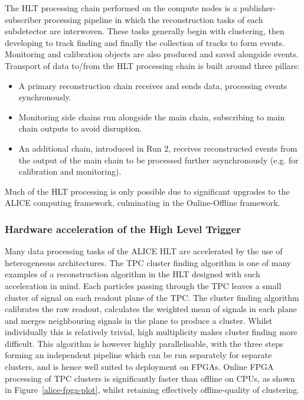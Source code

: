 The HLT processing chain performed on the compute nodes is a publisher-subscriber processing pipeline in which the reconstruction tasks of each subdetector are interwoven. These tasks generally begin with clustering, then developing to track finding and finally the collection of tracks to form events. Monitoring and calibration objects are also produced and saved alongside events. Transport of data to/from the HLT processing chain is built around three pillars:
\begin{itemize}
    \item A primary reconstruction chain receives and sends data, processing events synchronously.
    \item Monitoring side chains run alongside the main chain, subscribing to main chain outputs to avoid disruption.
    \item An additional chain, introduced in Run 2, receives reconstructed events from the output of the main chain to be processed further asynchronously (e.g. for calibration and monitoring).
\end{itemize}
Much of the HLT processing is only possible due to significant upgrades to the ALICE computing framework, culminating in the Online-Offline \cite{alice-o2-tdr} framework.

\subsubsection{Hardware acceleration of the High Level Trigger}
\label{alice-accel}

Many data processing tasks of the ALICE HLT are accelerated by the use of heterogeneous architectures. The TPC cluster finding algorithm is one of many examples of a reconstruction algorithm in the HLT designed with such acceleration in mind. Each particles passing through the TPC leaves a small cluster of signal  on each readout plane of the TPC. The cluster finding algorithm calibrates the raw readout, calculates the weighted mean of signals in each plane and merges neighbouring signals in the plane to produce a cluster. Whilst individually this is relatively trivial, high multiplicity makes cluster finding more difficult. This algorithm is however highly parallelisable, with the three steps forming an independent pipeline which can be run separately for separate clusters, and is hence well suited to deployment on FPGAs. Online FPGA processing of TPC clusters is significantly faster than offline on CPUs, as shown in Figure~\ref{alice-fpga-plot}, whilst retaining effectively offline-quality of clustering.

